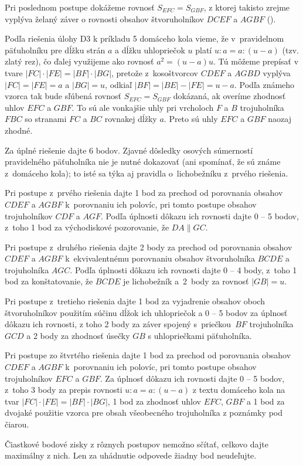 {\ineriesenie
Pri poslednom postupe dokážeme rovnosť $S_{EFC}=S_{GBF}$, z ktorej
takisto zrejme vyplýva želaný záver o rovnosti obsahov štvoruholníkov
$DCEF$ a $AGBF$ ().

Podľa riešenia úlohy D3 k príkladu 5 domáceho kola vieme, že
v~pravidelnom päťuholníku pre dĺžku strán $a$ a dĺžku
uhlopriečok $u$ platí $u:a=a:(u-a)$ (tzv. zlatý rez), čo ďalej
využijeme ako rovnosť $a^2=(u-a)u$. Tú môžeme prepísať v tvare
$|FC|\cdot|FE|=|BF|\cdot|BG|$, pretože z~kosoštvorcov
$CDEF$ a $AGBD$ vyplýva $|FC|=|FE|=a$ a $|BG|=u$, odkiaľ
$|BF|=|BE|-|FE|= u-a$. Podľa známeho vzorca tak bude sľúbená
rovnosť $S_{EFC}=S_{GBF}$ dokázaná, ak overíme zhodnosť uhlov
$EFC$ a $GBF$. To sú ale vonkajšie uhly pri vrcholoch $F$ a $B$
trojuholníka $FBC$ so stranami $FC$ a $BC$ rovnakej dĺžky $a$. Preto sú
uhly $EFC$ a $GBF$ naozaj zhodné.

\schemaABC
Za úplné riešenie dajte 6 bodov. Zjavné dôsledky osových
súmerností pravidelného päťuholníka nie je nutné dokazovať (ani
spomínať, že sú známe z~domáceho kola); to isté sa týka
aj pravidla o~lichobežníku z~prvého riešenia.

Pri postupe z~prvého riešenia dajte 1 bod za prechod od porovnania
obsahov $CDEF$ a $AGBF$ k~porovnaniu ich polovíc, pri tomto
postupe obsahov trojuholníkov $CDF$ a $AGF$. Podľa úplnosti dôkazu ich rovnosti
dajte 0 -- 5 bodov, z~toho 1 bod za východiskové pozorovanie,
že $DA\parallel GC$.

Pri postupe z~druhého riešenia dajte 2 body za prechod
od porovnania obsahov $CDEF$ a $AGBF$ k~ekvivalentnému porovnaniu
obsahov štvoruholníka $BCDE$ a trojuholníka $AGC$.
Podľa úplnosti dôkazu ich rovnosti dajte 0 -- 4 body,
z~toho 1 bod za konštatovanie, že $BCDE$ je lichobežník a~2~body za rovnosť $|GB|=u$.

Pri postupe z~tretieho riešenia dajte 1 bod za vyjadrenie obsahov oboch
štvoruholníkov použitím súčinu dĺžok ich uhlopriečok a 0 -- 5 bodov
za úplnosť dôkazu ich rovnosti, z toho 2 body za záver
spojený s~priečkou~$BF$ trojuholníka $GCD$ a 2 body za zhodnosť úsečky
$GB$ s uhlopriečkami päťuholníka.

Pri postupe zo štvrtého riešenia dajte 1 bod za prechod od porovnania
obsahov $CDEF$ a $AGBF$ k~porovnaniu ich polovíc, pri tomto
postupe obsahov trojuholníkov $EFC$ a $GBF$. Za úplnosť dôkazu
ich rovnosti dajte
0 -- 5 bodov, z~toho 3 body za prepis rovnosti $u:a=a:(u-a)$ z textu
domáceho kola na tvar $|FC|\cdot|FE|=|BF|\cdot|BG|$,
1 bod za zhodnosť uhlov $EFC$, $GBF$ a 1 bod za dvojaké použitie
vzorca pre obsah všeobecného trojuholníka z poznámky pod čiarou.

Čiastkové bodové zisky z rôznych postupov nemožno sčítať,
celkovo dajte maximálny z nich. Len za uhádnutie
odpovede žiadny bod neudeľujte.
\endschema
}

